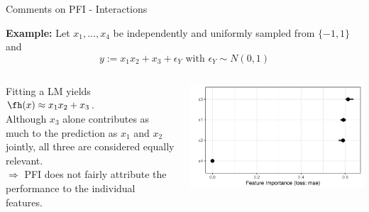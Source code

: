 \documentclass[11pt,compress,t,notes=noshow, aspectratio=169, xcolor=table]{beamer}
\begin{document}
\begin{frame}{Comments on PFI - Interactions}

\textbf{Example:} Let $x_1, \dots, x_4$ be independently and uniformly sampled from $\{-1, 1\}$ and 
$$y:= x_1 x_2 + x_3 + \epsilon_Y \text{ with } \epsilon_Y \sim N(0, 1)$$

\begin{columns}[T, totalwidth = \textwidth]
\begin{column}{0.5\textwidth}

Fitting a LM yields $\fh(x) \approx x_1 x_2 + x_3$.\\
\lz\pause
Although $x_3$ alone contributes as much to the prediction as $x_1$ and $x_2$ jointly, all three are considered equally relevant.\\
\lz
$\Rightarrow$ PFI does not fairly attribute the performance to the individual features.

\end{column}
\begin{column}{0.5\textwidth}
\centering
  \includegraphics[width=\linewidth]{figure_man/pfi_interactions.pdf}
\end{column}
\end{columns}


\end{frame}
\end{document}
